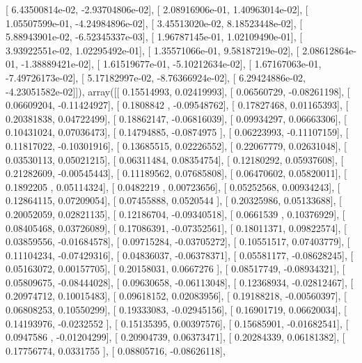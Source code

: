 \documentclass{article}
\begin{document}
       [  6.43500814e-02,  -2.93704806e-02],
       [  2.08916906e-01,   1.40963014e-02],
       [  1.05507599e-01,  -4.24984896e-02],
       [  3.45513020e-02,   8.18523448e-02],
       [  5.88943901e-02,  -6.52345337e-03],
       [  1.96787145e-01,   1.02109490e-01],
       [  3.93922551e-02,   1.02295492e-01],
       [  1.35571066e-01,   9.58187219e-02],
       [  2.08612864e-01,  -1.38889421e-02],
       [  1.61519677e-01,  -5.10212634e-02],
       [  1.67167063e-01,  -7.49726173e-02],
       [  5.17182997e-02,  -8.76366924e-02],
       [  6.29424886e-02,  -4.23051582e-02]]), array([[ 0.15514993,  0.02419993],
       [ 0.06560729, -0.08261198],
       [ 0.06609204, -0.11424927],
       [ 0.1808842 , -0.09548762],
       [ 0.17827468,  0.01165393],
       [ 0.20381838,  0.04722499],
       [ 0.18862147, -0.06816039],
       [ 0.09934297,  0.06663306],
       [ 0.10431024,  0.07036473],
       [ 0.14794885, -0.0874975 ],
       [ 0.06223993, -0.11107159],
       [ 0.11817022, -0.10301916],
       [ 0.13685515,  0.02226552],
       [ 0.22067779,  0.02631048],
       [ 0.03530113,  0.05021215],
       [ 0.06311484,  0.08354754],
       [ 0.12180292,  0.05937608],
       [ 0.21282609, -0.00545443],
       [ 0.11189562,  0.07685808],
       [ 0.06470602,  0.05820011],
       [ 0.1892205 ,  0.05114324],
       [ 0.0482219 ,  0.00723656],
       [ 0.05252568,  0.00934243],
       [ 0.12864115,  0.07209054],
       [ 0.07455888,  0.0520544 ],
       [ 0.20325986,  0.05133688],
       [ 0.20052059,  0.02821135],
       [ 0.12186704, -0.09340518],
       [ 0.0661539 ,  0.10376929],
       [ 0.08405468,  0.03726089],
       [ 0.17086391, -0.07352561],
       [ 0.18011371,  0.09822574],
       [ 0.03859556, -0.01684578],
       [ 0.09715284, -0.03705272],
       [ 0.10551517,  0.07403779],
       [ 0.11104234, -0.07429316],
       [ 0.04836037, -0.06378371],
       [ 0.05581177, -0.08628245],
       [ 0.05163072,  0.00157705],
       [ 0.20158031,  0.0667276 ],
       [ 0.08517749, -0.08934321],
       [ 0.05809675, -0.08444028],
       [ 0.09630658, -0.06113048],
       [ 0.12368934, -0.02812467],
       [ 0.20974712,  0.10015483],
       [ 0.09618152,  0.02083956],
       [ 0.19188218, -0.00560397],
       [ 0.06808253,  0.10550299],
       [ 0.19333083, -0.02945156],
       [ 0.16901719,  0.06620034],
       [ 0.14193976, -0.0232552 ],
       [ 0.15135395,  0.00397576],
       [ 0.15685901, -0.01682541],
       [ 0.0947586 , -0.01204299],
       [ 0.20904739,  0.06373471],
       [ 0.20284339,  0.06181382],
       [ 0.17756774,  0.0331755 ],
       [ 0.08805716, -0.08626118],
\end{document}
